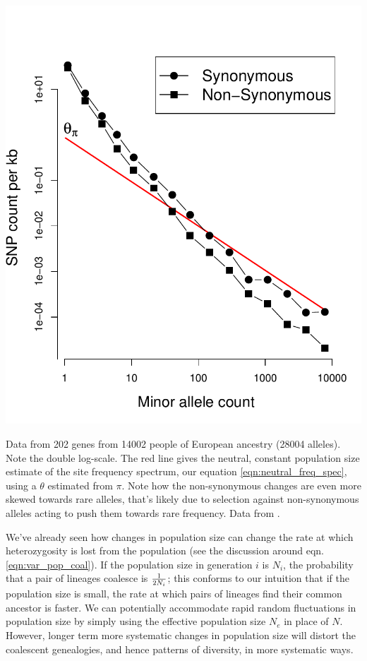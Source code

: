 \begin{marginfigure}
\begin{center}
  \includegraphics[width = \textwidth]{Journal_figs/genetic_drift/human_pop_growth/Nelson_pop_growth.pdf}
\end{center}
\caption{Data from 202 genes from 14002 people of European ancestry (28004 alleles). Note
  the double log-scale. The red
  line gives the neutral, constant population size estimate of the site frequency spectrum, our equation \eqref{eqn:neutral_freq_spec}, using a  $\theta$ estimated from $\pi$. Note how the non-synonymous changes are even more skewed towards rare alleles, that's likely due to selection against non-synonymous alleles acting to push them towards rare frequency. Data from \citet{nelson:12}.  } \label{fig:Human_growth}
\end{marginfigure}
We've already seen how changes in population size can change the rate
at which heterozygosity is lost from the population (see the
discussion around eqn. \eqref{eqn:var_pop_coal}). If the population
size in generation $i$ is $N_i$, the probability that a pair of
lineages coalesce is $\nicefrac{1}{2N_i}$; this conforms to our
intuition that if the population size is small, the rate at which
pairs of lineages find their common ancestor is faster. We can potentially accommodate rapid random fluctuations in population size by simply using the effective population size $N_e$ in place of $N$. However,
longer term more systematic changes in population size will distort
the coalescent genealogies, and hence patterns of diversity, in more
systematic ways. 

